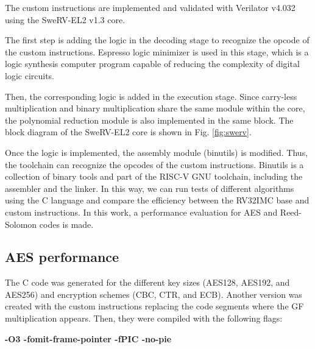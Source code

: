 The custom instructions are implemented and validated with Verilator v4.032 using the SweRV-EL2 v1.3 core.

The first step is adding the logic in the decoding stage to recognize the opcode of the custom instructions. 
Espresso logic minimizer \cite{250190} is used in this stage, which is a logic synthesis computer program capable 
of reducing the complexity of digital logic circuits.

Then, the corresponding logic is added in the execution stage. Since carry-less multiplication and binary 
multiplication share the same module within the core, the polynomial reduction module is also implemented 
in the same block. The block diagram of the SweRV-EL2 core is shown in Fig. \ref{fig:swerv}.

Once the logic is implemented, the assembly module (binutils) is modified. Thus, the toolchain can recognize 
the opcodes of the custom instructions. Binutils is a collection of 
binary tools and part of the RISC-V GNU toolchain, including the assembler and the linker.
In this way, we can run tests of different algorithms using the C language and compare the efficiency between the RV32IMC base and custom instructions. 
In this work, a performance evaluation for AES and Reed-Solomon codes is made.

\subsection{AES performance} 

The C code was generated for the different key sizes (AES128, AES192, and AES256) and encryption schemes (CBC, CTR, and ECB). Another version was created with the custom instructions replacing
the code segments where the GF multiplication appears. 
Then, they were compiled with the following flags: 

\begin{center}
\textbf{-O3 -fomit-frame-pointer -fPIC -no-pie}
\end{center}

